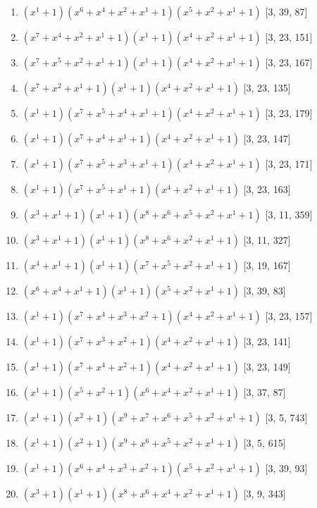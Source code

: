 \documentclass[10pt,twocolumn]{article}
\begin{document}
\begin{enumerate}
\item $(x^{1} + 1)(x^{6} + x^{4} + x^{2} + x^{1} + 1)(x^{5} + x^{2} + x^{1} + 1)$  [3, 39, 87]
\item $(x^{7} + x^{4} + x^{2} + x^{1} + 1)(x^{1} + 1)(x^{4} + x^{2} + x^{1} + 1)$  [3, 23, 151]
\item $(x^{7} + x^{5} + x^{2} + x^{1} + 1)(x^{1} + 1)(x^{4} + x^{2} + x^{1} + 1)$  [3, 23, 167]
\item $(x^{7} + x^{2} + x^{1} + 1)(x^{1} + 1)(x^{4} + x^{2} + x^{1} + 1)$  [3, 23, 135]
\item $(x^{1} + 1)(x^{7} + x^{5} + x^{4} + x^{1} + 1)(x^{4} + x^{2} + x^{1} + 1)$  [3, 23, 179]
\item $(x^{1} + 1)(x^{7} + x^{4} + x^{1} + 1)(x^{4} + x^{2} + x^{1} + 1)$  [3, 23, 147]
\item $(x^{1} + 1)(x^{7} + x^{5} + x^{3} + x^{1} + 1)(x^{4} + x^{2} + x^{1} + 1)$  [3, 23, 171]
\item $(x^{1} + 1)(x^{7} + x^{5} + x^{1} + 1)(x^{4} + x^{2} + x^{1} + 1)$  [3, 23, 163]
\item $(x^{3} + x^{1} + 1)(x^{1} + 1)(x^{8} + x^{6} + x^{5} + x^{2} + x^{1} + 1)$  [3, 11, 359]
\item $(x^{3} + x^{1} + 1)(x^{1} + 1)(x^{8} + x^{6} + x^{2} + x^{1} + 1)$  [3, 11, 327]
\item $(x^{4} + x^{1} + 1)(x^{1} + 1)(x^{7} + x^{5} + x^{2} + x^{1} + 1)$  [3, 19, 167]
\item $(x^{6} + x^{4} + x^{1} + 1)(x^{1} + 1)(x^{5} + x^{2} + x^{1} + 1)$  [3, 39, 83]
\item $(x^{1} + 1)(x^{7} + x^{4} + x^{3} + x^{2} + 1)(x^{4} + x^{2} + x^{1} + 1)$  [3, 23, 157]
\item $(x^{1} + 1)(x^{7} + x^{3} + x^{2} + 1)(x^{4} + x^{2} + x^{1} + 1)$  [3, 23, 141]
\item $(x^{1} + 1)(x^{7} + x^{4} + x^{2} + 1)(x^{4} + x^{2} + x^{1} + 1)$  [3, 23, 149]
\item $(x^{1} + 1)(x^{5} + x^{2} + 1)(x^{6} + x^{4} + x^{2} + x^{1} + 1)$  [3, 37, 87]
\item $(x^{1} + 1)(x^{2} + 1)(x^{9} + x^{7} + x^{6} + x^{5} + x^{2} + x^{1} + 1)$  [3, 5, 743]
\item $(x^{1} + 1)(x^{2} + 1)(x^{9} + x^{6} + x^{5} + x^{2} + x^{1} + 1)$  [3, 5, 615]
\item $(x^{1} + 1)(x^{6} + x^{4} + x^{3} + x^{2} + 1)(x^{5} + x^{2} + x^{1} + 1)$  [3, 39, 93]
\item $(x^{3} + 1)(x^{1} + 1)(x^{8} + x^{6} + x^{4} + x^{2} + x^{1} + 1)$  [3, 9, 343]

\end{enumerate}
\end{document}

